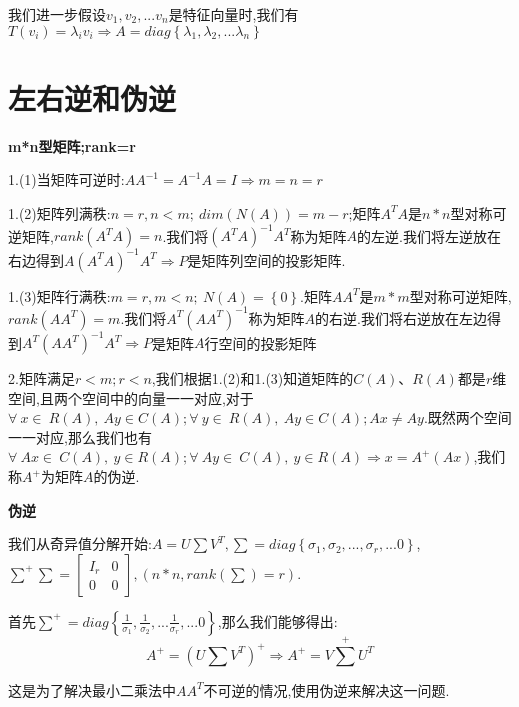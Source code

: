 \documentclass[oneside]{book}
\begin{document}
我们进一步假设$v_{1},v_{2},...v_{n}$是特征向量时,我们有$T(v_{i})=\lambda_{i} v_{i}\Rightarrow A=diag\left\lbrace\lambda_{1},\lambda_{2},...\lambda_{n} \right\rbrace $
	\chapter{左右逆和伪逆}
	\textbf{m*n型矩阵;rank=r}
	
	1.(1)当矩阵可逆时:$AA^{-1}=A^{-1}A=I\Rightarrow m=n=r$
	
	1.(2)矩阵列满秩:$n=r,n<m;\ dim(N(A))=m-r$;矩阵$A^{T}A$是$n*n$型对称可逆矩阵,$rank(A^{T}A)=n$.我们将$(A^{T}A)^{-1}A^{T}$称为矩阵$A$的左逆.我们将左逆放在右边得到$A(A^{T}A)^{-1}A^{T}\Rightarrow P$是矩阵列空间的投影矩阵.
	
	1.(3)矩阵行满秩:$m=r,m<n;\ N(A)=\left\lbrace 0 \right\rbrace $.矩阵$AA^{T}$是$m*m$型对称可逆矩阵,$rank(AA^{T})=m$.我们将$A^{T}(AA^{T})^{-1}$称为矩阵$A$的右逆.我们将右逆放在左边得到$A^{T}(AA^{T})^{-1}A^{T}\Rightarrow P$是矩阵$A$行空间的投影矩阵
	
	2.矩阵满足$r<m;r<n$,我们根据1.(2)和1.(3)知道矩阵的$C(A)$、$R(A)$都是$r$维空间,且两个空间中的向量一一对应,对于$\forall \ x\in\ R(A),\ Ay\in C(A);\forall \ y\in\ R(A),\ Ay\in C(A);Ax\neq Ay$.既然两个空间一一对应,那么我们也有$\forall \ Ax\in\ C(A),\ y\in R(A);\forall \ Ay\in\ C(A),\ y\in R(A)\Rightarrow x=A^{+}(Ax)$,我们称$A^{+}$为矩阵$A$的伪逆.
	
	\textbf{伪逆}
	
	我们从奇异值分解开始:$A=U\sum V^{T},\sum=diag\left\lbrace\sigma_{1},\sigma_{2},...,\sigma_{r},...0 \right\rbrace $,$\sum^{+}\sum=\left[\begin{array}{cc}
		I_{r}&0\\0&0
	\end{array}\right],(n*n,rank(\sum)=r)$.

首先$\sum^{+}=diag\left\lbrace\frac{1}{\sigma_{1}},\frac{1}{\sigma_{2}},...\frac{1}{\sigma_{r}},...0
 \right\rbrace $,那么我们能够得出:$$A^{+}=(U\sum V^{T})^{+}\Rightarrow A^{+}=V \sum^{+} U^{T}$$
 
 这是为了解决最小二乘法中$AA^{T}$不可逆的情况,使用伪逆来解决这一问题.
\end{document}
